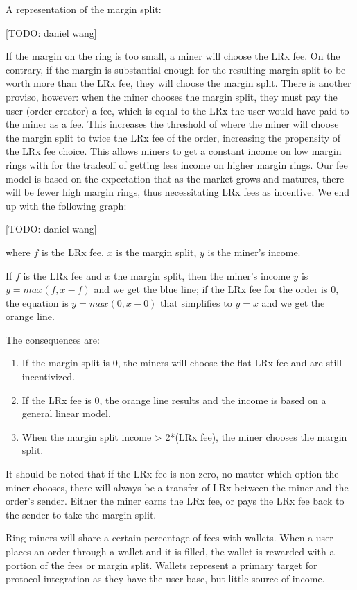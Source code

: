 \documentclass[UTF8,nofonts]{article}
\begin{document}
A representation of the margin split:

[TODO: daniel wang]

If the margin on the ring is too small, a miner will choose the LRx fee. On the contrary, if the margin is substantial enough for the resulting margin split to be worth more than the LRx fee, they will choose the margin split. There is another proviso, however: when the miner chooses the margin split, they must pay the user (order creator) a fee, which is equal to the LRx the user would have paid to the miner as a fee. This increases the threshold of where the miner will choose the margin split to twice the LRx fee of the order, increasing the propensity of the LRx fee choice. This allows miners to get a constant income on low margin rings with for the tradeoff of getting less income on higher margin rings. Our fee model is based on the expectation that as the market grows and matures, there will be fewer high margin rings, thus necessitating LRx fees as incentive.
We end up with the following graph:

[TODO: daniel wang]

where $f$ is the LRx fee, $x$ is the margin split, $y$ is the miner's income.

If $f$ is the LRx fee and $x$ the margin split, then the miner's income $y$ is $y=max(f, x-f)$ and we get the blue line; if the LRx fee for the order is $0$, the equation is $y=max(0, x - 0)$ that simplifies to $y=x$ and we get the orange line.

The consequences are:  
\begin{enumerate}
	\item If the margin split is 0, the miners will choose the flat LRx fee and are still incentivized. 
	\item If the LRx fee is 0, the orange line results and the income is based on a general linear model.
	\item When the margin split income > 2*(LRx fee), the miner chooses the margin split.
\end{enumerate}

It should be noted that if the LRx fee is non-zero, no matter which option the miner chooses, there will always be a transfer of LRx between the miner and the order's sender. Either the miner earns the LRx fee, or pays the LRx fee back to the sender to take the margin split.

Ring miners will share a certain percentage of fees with wallets. When a user places an order through a wallet and it is filled, the wallet is rewarded with a portion of the fees or margin split. Wallets represent a primary target for protocol integration as they have the user base, but little source of income. 
\end{document}
